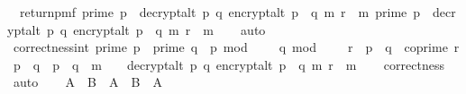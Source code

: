 \begin{isabellebody}
\ \ return{\isacharunderscore}{\kern0pt}pmf\ {\isacharparenleft}{\kern0pt}{\isacharparenleft}{\kern0pt}prime\ p\ {\isasymlongrightarrow}\ decrypt{\isacharunderscore}{\kern0pt}alt\ p\ q\ {\isacharparenleft}{\kern0pt}encrypt{\isacharunderscore}{\kern0pt}alt\ {\isacharparenleft}{\kern0pt}p\ {\isacharasterisk}{\kern0pt}\ q{\isacharparenright}{\kern0pt}\ m\ r{\isacharparenright}{\kern0pt}\ {\isacharequal}{\kern0pt}\ m{\isacharparenright}{\kern0pt}{\isasymand}\ {\isacharparenleft}{\kern0pt}{\isasymnot}prime\ p\ {\isasymlongrightarrow}\ decrypt{\isacharunderscore}{\kern0pt}alt\ p\ q\ {\isacharparenleft}{\kern0pt}encrypt{\isacharunderscore}{\kern0pt}alt\ {\isacharparenleft}{\kern0pt}p\ {\isacharasterisk}{\kern0pt}\ q{\isacharparenright}{\kern0pt}\ m\ r{\isacharparenright}{\kern0pt}\ {\isacharequal}{\kern0pt}\ m{\isacharparenright}{\kern0pt}{\isacharparenright}{\kern0pt}{\isacharbraceright}{\kern0pt}{\isacharparenright}{\kern0pt}{\isachardoublequoteclose}\isanewline
\ \ \isamarkupfalse%
\ auto\isanewline
\isanewline
\ \ \isanewline
\ \ \isamarkupfalse%
\ correctness{\isacharunderscore}{\kern0pt}int{\isacharcolon}{\kern0pt}\ {\isachardoublequoteopen}{\isacharparenleft}{\kern0pt}prime\ p\ {\isasymand}\ prime\ q\ {\isasymand}\ p\ mod\ {}\ {\isacharequal}{\kern0pt}\ {}\ {\isasymand}\ q\ mod\ {}\ {\isacharequal}{\kern0pt}\ {}\ {\isasymand}\ r\ {\isacharless}{\kern0pt}\ p\ {\isacharasterisk}{\kern0pt}\ q\ {\isasymand}\ coprime\ r\ {\isacharparenleft}{\kern0pt}p\ {\isacharasterisk}{\kern0pt}\ q{\isacharparenright}{\kern0pt}\ {\isasymand}\ p\ {\isasymnoteq}\ q\ {\isasymand}\ m\ {\isasymnoteq}\ {\isacharbrackleft}{\kern0pt}{\isacharbrackright}{\kern0pt}{\isacharparenright}{\kern0pt}\ {\isasymlongrightarrow}\ decrypt{\isacharunderscore}{\kern0pt}alt\ p\ q\ {\isacharparenleft}{\kern0pt}encrypt{\isacharunderscore}{\kern0pt}alt\ {\isacharparenleft}{\kern0pt}p\ {\isacharasterisk}{\kern0pt}\ q{\isacharparenright}{\kern0pt}\ m\ r{\isacharparenright}{\kern0pt}\ {\isacharequal}{\kern0pt}\ m{\isachardoublequoteclose}\isanewline
\ \ \isamarkupfalse%
\ correctness\isanewline
\ \ \isamarkupfalse%
\ auto\isanewline
\isanewline
\ \ \isamarkupfalse%
\ {\isachardoublequoteopen}A\ {\isacharequal}{\kern0pt}\ {\isacharparenleft}{\kern0pt}{\isacharparenleft}{\kern0pt}B\ {\isasymlongrightarrow}\ A{\isacharparenright}{\kern0pt}\ {\isasymand}\ {\isacharparenleft}{\kern0pt}{\isasymnot}B\ {\isasymlongrightarrow}\ A{\isacharparenright}{\kern0pt}{\isacharparenright}{\kern0pt}{\isachardoublequoteclose}\ \isanewline

\end{isabellebody}
